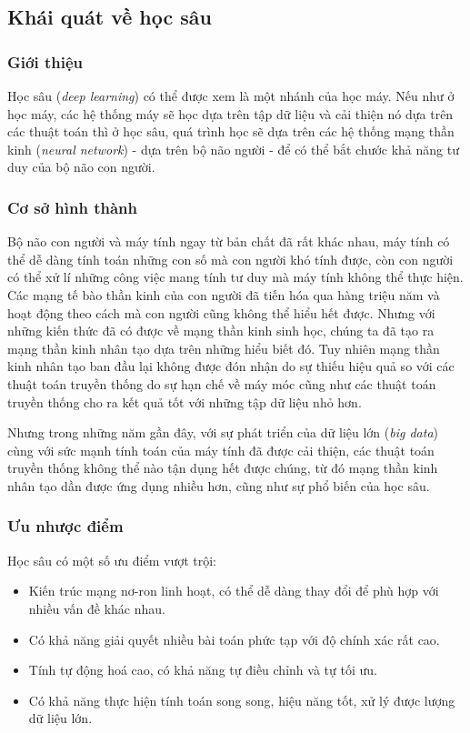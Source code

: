 \subsection{Khái quát về học sâu}
\subsubsection{Giới thiệu}
Học sâu (\textit{deep learning}) có thể được xem là một nhánh của học máy. Nếu như ở học máy, các hệ thống máy sẽ học dựa trên tập dữ liệu và cải thiện nó dựa trên các thuật toán thì ở học sâu, quá trình học sẽ dựa trên các hệ thống mạng thần kinh (\textit{neural network}) - dựa trên bộ não người - để có thể bắt chước khả năng tư duy của bộ não con người.\cite{webpage10}

\subsubsection{Cơ sở hình thành}
Bộ não con người và máy tính ngay từ bản chất đã rất khác nhau, máy tính có thể dễ dàng tính toán những con số mà con người khó tính được, còn con người có thể xử lí những công việc mang tính tư duy mà máy tính không thể thực hiện. Các mạng tế bào thần kinh của con người đã tiến hóa qua hàng triệu năm và hoạt động theo cách mà con người cũng không thể hiểu hết được. Nhưng với những kiến thức đã có được về mạng thần kinh sinh học, chúng ta đã tạo ra mạng thần kinh nhân tạo dựa trên những hiểu biết đó. Tuy nhiên mạng thần kinh nhân tạo ban đầu lại không được đón nhận do sự thiếu hiệu quả so với các thuật toán truyền thống do sự hạn chế về máy móc cũng như các thuật toán truyền thống cho ra kết quả tốt với những tập dữ liệu nhỏ hơn.

Nhưng trong những năm gần đây, với sự phát triển của dữ liệu lớn (\textit{big data}) cùng với sức mạnh tính toán của máy tính đã được cải thiện, các thuật toán truyền thống không thể nào tận dụng hết được chúng, từ đó mạng thần kinh nhân tạo dần được ứng dụng nhiều hơn, cũng như sự phổ biến của học sâu.\cite{Aggarwal2022}

\subsubsection{Ưu nhược điểm}
Học sâu có một số ưu điểm vượt trội:
\begin{itemize}
    \item Kiến trúc mạng nơ-ron linh hoạt, có thể dễ dàng thay đổi để phù hợp với nhiều vấn đề khác nhau.
    \item Có khả năng giải quyết nhiều bài toán phức tạp với độ chính xác rất cao.
    \item Tính tự động hoá cao, có khả năng tự điều chỉnh và tự tối ưu.
    \item Có khả năng thực hiện tính toán song song, hiệu năng tốt, xử lý được lượng dữ liệu lớn.
\end{itemize}

